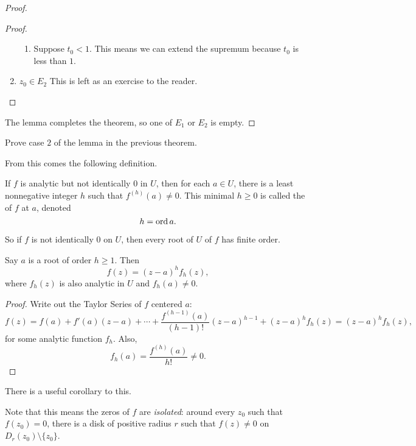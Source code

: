 \begin{proof}
\begin{proof}
\begin{enumerate}
\begin{enumerate}
                    \item Suppose $t_0 < 1$.
                        This means we can extend the supremum 
                        because $t_0$
                        is less than $1$.
                \end{enumerate}

            \item $z_0 \in E_2$
                This is left as an exercise to the reader.
        \end{enumerate}

    \end{proof}

        The lemma completes the theorem, so one of $E_1$
        or $E_2$ is empty.


\end{proof}

\begin{exercise}
    Prove case $2$ of the lemma in the previous theorem.
\end{exercise}

From this comes the following definition.

\begin{definition}
    If $f$ is analytic but not identically $0$ in $U$, 
    then for each $a \in U$, there is a least nonnegative
    integer $h$ such that $f^{(h)}(a) \ne 0$.
    This minimal $h \ge 0$ is called the  of $f$ at $a$, denoted
    \[ h = \operatorname{ord}{a}. \]
\end{definition}

So if $f$ is not identically $0$ on $U$, then every
root of $U$ of $f$ has finite order.

\begin{theorem}
    Say $a$ is a root of order $h \ge 1$.
    Then
    \[ f(z) = (z-a)^h f_h(z), \]
    where $f_h(z)$ is also analytic in $U$ and
    $f_h(a) \ne 0$.
\end{theorem}

\begin{proof}
    Write out the Taylor Series of $f$ centered $a$:
    \[ f(z) = f(a) + f'(a)(z-a) + \cdots + \frac{f^{(h-1)}(a)}{(h-1)!} (z-a)^{h-1} + (z-a)^h f_h(z)
        = (z-a)^h f_h(z),
    \]
    for some analytic function $f_h$.
    Also,
    \[ f_h(a) = \frac{f^{(h)}(a)}{h!} \ne 0. \]
\end{proof}

There is a useful corollary to this.

\begin{cor}
    Note that this means the zeros of $f$ are \textit{isolated}:
    around every $z_0$ such that $f(z_0) = 0$, there is a disk
    of positive radius $r$ such that $f(z) \ne 0$ on
    $D_r(z_0) \setminus \{ z_0 \}$.
\end{cor}



